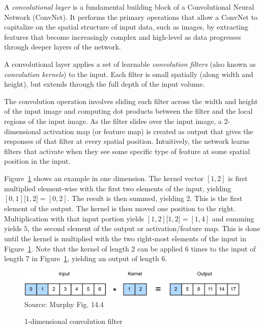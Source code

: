 A \emph{convolutional layer} is a fundamental building block of a Convolutional Neural Network (ConvNet). It performs the primary operations that allow a ConvNet to capitalize on the spatial structure of input data, such as images, by extracting features that become increasingly complex and high-level as data progresses through deeper layers of the network.

A convolutional layer applies a set of learnable \emph{convolution filters} (also known as \emph{convolution kernels}) to the input. Each filter is small spatially (along width and height), but extends through the full depth of the input volume.

The convolution operation involves sliding each filter across the width and height of the input image and computing dot products between the filter and the local regions of the input image. As the filter slides over the input image, a 2-dimensional activation map (or feature map) is created as output that gives the responses of that filter at every spatial position. Intuitively, the network learns filters that activate when they see some specific type of feature at some spatial position in the input.

Figure~\ref{fig:screen1_chap16} shows an example in one dimension. The kernel vector $[1, 2]$ is first multiplied element-wise with the first two elements of the input, yielding $[0,1] \dot [1, 2] = [0, 2]$. The result is then summed, yielding $2$. This is the first element of the output. The kernel is then moved one position to the right. Multiplication with that input portion yields $[1, 2] \dot [1, 2] = [1, 4]$ and summing yields $5$, the second element of the output or activation/feature map. This is done until the kernel is multiplied with the two right-most elements of the input in Figure~\ref{fig:screen1_chap16}. Note that the kernel of length 2 can be applied 6 times to the input of length 7 in Figure~\ref{fig:screen1_chap16}, yielding an output of length 6.

\begin{figure}[b]
\centering
\includegraphics[width=.8\textwidth]{screen1.png} \\

\scriptsize Source: Murphy Fig. 14.4 \normalsize
\caption{1-dimensional convolution filter}
\label{fig:screen1_chap16}
\end{figure}

